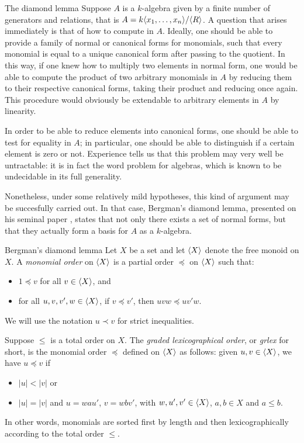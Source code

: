 \begin{chapter}{The diamond lemma}
Suppose $A$ is a $k$-algebra given by a finite number of generators and relations, that is $A=k\langle x_1,\dots,x_n\rangle/\langle R\rangle$. A question that arises immediately is that of how to compute in $A$. Ideally, one should be able to provide a family of normal or canonical forms for monomials, such that every monomial is equal to a unique canonical form after passing to the quotient. In this way, if one knew how to multiply two elements in normal form, one would be able to compute the product of two arbitrary monomials in $A$ by reducing them to their respective canonical forms, taking their product and reducing once again. This procedure would obviously be extendable to arbitrary elements in $A$ by linearity.

In order to be able to reduce elements into canonical forms, one should be able to test for equality in $A$; in particular, one should be able to distinguish if a certain element is zero or not. Experience tells us that this problem may very well be untractable: it is in fact the word problem for algebras, which is known to be undecidable in its full generality. 

Nonetheless, under some relatively mild hypotheses, this kind of argument may be succesfully carried out. In that case, Bergman's diamond lemma, presented on his seminal paper \cite{Ber78}, states that not only there exists a set of normal forms, but that they actually form a basis for $A$ as a $k$-algebra.

\begin{section}{Bergman's diamond lemma}
 Let $X$ be a set and let $\langle X\rangle$ denote the free monoid on $X$. A \emph{monomial order} on $\langle X\rangle$ is a partial order $\preceq$ on $\langle X\rangle$ such that:
\begin{itemize}
\item $1\preceq v$ for all $v\in \langle X\rangle$, and
\item for all $u,v,v',w\in \langle X\rangle$, if $v\preceq v'$, then $uvw\preceq uv'w$.
\end{itemize}
We will use the notation $u\prec v$ for strict inequalities.
\begin{exmp} Suppose $\leq$ is a total order on $X$. The \emph{graded lexicographical order}, or \emph{grlex} for short, is the monomial order $\preceq$ defined on $\langle X\rangle$ as follows: given $u,v\in \langle X\rangle$, we have $u\preceq v$ if
\begin{itemize}
\item $|u| < |v|$ or
\item $|u| = |v|$ and $u=wau'$, $v=wbv'$, with $w,u',v'\in \langle X\rangle$, $a,b\in X$ and $a\leq b$.
\end{itemize}
In other words, monomials are sorted first by length and then lexicographically according to the total order $\leq$.
\end{exmp}


\end{section}
\end{chapter}
